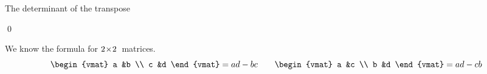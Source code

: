 \documentclass[10pt,t,serif,professionalfont]{beamer}
\begin{document}
\begin{frame}{The determinant of the transpose}
\th[th:DetMatrixEqualsDetTrans]

\pf
{}
\end{frame}
\begin{frame}
\qed

\pause
\ex
We know the formula for $2 \! \times \! 2$~matrices.
\begin{equation*}
  \begin{vmat}
    a  &b  \\
    c  &d
  \end{vmat}
  =ad-bc
  \qquad
  \begin{vmat}
    a  &c  \\
    b  &d
  \end{vmat}
  =ad-cb
\end{equation*}
\end{frame}







% 
\end{document}
